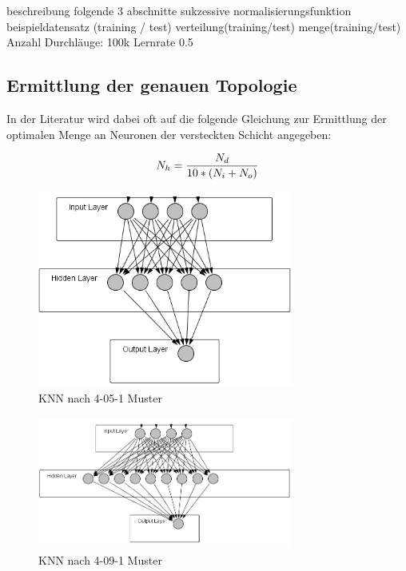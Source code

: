 \documentclass[a4paper,DIV11,bibliography=totoc,headings=normal,ngerman,headsepline,listof=totoc,parskip=half]{scrreprt}
\newcommand*{\formelentry}[1]{\addcontentsline{for}{formel}{\protect\numberline{Formel~\theequation} #1}}
\begin{document}
beschreibung folgende 3 abschnitte sukzessive
normalisierungsfunktion
beispieldatensatz (training / test)
verteilung(training/test)
menge(training/test)
Anzahl Durchläuge: 100k
Lernrate 0.5


\subsection{Ermittlung der genauen Topologie} %
In der Literatur wird dabei oft auf die folgende Gleichung zur Ermittlung der optimalen  Menge an Neuronen der versteckten Schicht angegeben:

\begin{equation}\formelentry{Optimale Anzahl Neuronen in der versteckten Schicht}
  N_h = \frac{N_d}{10*(N_i+N_o)}
\end{equation}


\begin{figure}[htbp]
\centering
		\includegraphics[width=0.75\textwidth]{4-5-1.PNG}
	\caption{KNN nach 4-05-1 Muster}
	\label{fig:KNN nach 4-05-1 Muster}
\end{figure}


\begin{figure}[H]
\centering
		\includegraphics[width=0.75\textwidth]{4-9-1.PNG}
	\caption{KNN nach 4-09-1 Muster}
	\label{fig:KNN nach 4-09-1 Muster}
\end{figure}
\end{document}
